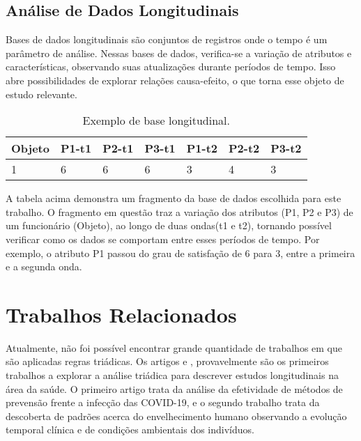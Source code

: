 \documentclass[kdmile,a4paper]{kdmile} %
\begin{document}
 \subsection{Análise de Dados Longitudinais}

 Bases de dados longitudinais são conjuntos de registros onde o tempo é um parâmetro de análise. Nessas bases de dados, verifica-se a variação de atributos e características, observando suas atualizações durante períodos de tempo. Isso abre possibilidades de explorar relações causa-efeito, o que torna esse objeto de estudo relevante.



\begin{table}[h!]
\centering
\begin{tabular}{ p{1cm}p{1cm}p{1cm}p{1cm}p{1cm}p{1cm}p{1cm}  }
 \hline
 \footnotesize{Objeto}& 
 \footnotesize{P1-t1}&
 \footnotesize{P2-t1}&
 \footnotesize{P3-t1}&
  \footnotesize{P1-t2}&
  \footnotesize{P2-t2}&
  \footnotesize{P3-t2}
 \\
\hline
\footnotesize{1}& 
\footnotesize{6}&
\footnotesize{6}&
\footnotesize{6}&
\footnotesize{3}&
\footnotesize{4}&
\footnotesize{3}
\\
\hline
\end{tabular}
\caption{Exemplo de base longitudinal.}
\label{table:Table II}
\end{table}

A tabela acima demonstra um fragmento da base de dados escolhida para este trabalho. O fragmento em questão traz a variação dos atributos (P1, P2 e P3) de um funcionário (Objeto), ao longo de duas ondas(t1 e t2), tornando possível verificar como os dados se comportam entre esses períodos de tempo. Por exemplo, o atributo P1 passou do grau de satisfação de 6 para 3, entre a primeira e a segunda onda. %

\section{Trabalhos Relacionados}


Atualmente, não foi possível encontrar grande quantidade de trabalhos em que são aplicadas regras triádicas. Os artigos \cite{Lana2022} e \cite{Noronha2022}, provavelmente são os primeiros trabalhos a explorar a análise triádica para descrever estudos longitudinais na área da saúde. O primeiro artigo trata da análise da efetividade de métodos de prevensão frente a infecção das COVID-19, e o segundo trabalho trata da descoberta de padrões acerca do envelhecimento humano observando a evolução temporal clínica e de condições ambientais dos indivíduos.
\end{document}
